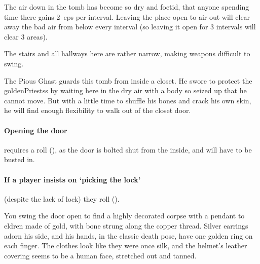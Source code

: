 \begin{multicols}{2}
The air down in the tomb has become so dry and foetid, that anyone spending time there gains 2~\glspl{ep} per \gls{interval}.
Leaving the place open to air out will clear away the bad air from  below every \gls{interval} (so leaving it open for 3 \glspl{interval} will clear 3 \glspl{area}).

The stairs and all hallways here are rather narrow, making weapons difficult to swing.%


The Pious Ghast guards this tomb from inside a closet.
He swore to protect the \glspl{goldenPriests} by waiting here in the dry air with a body so seized up that he cannot move.
But with a little time to shuffle his bones and crack his own skin, he will find enough flexibility to walk out of the closet door.


\paragraph{Opening the door}
requires a  roll (\tn[14]), as the door is bolted shut from the inside, and will have to be busted in.

\paragraph{If a player insists on `picking the lock'}
(despite the lack of lock) they roll  (\tn[16]).

\begin{boxtext}
  You swing the door open to find a highly decorated corpse with a pendant to \gls{eldren} made of gold, with bone strung along the copper thread.
  Silver earrings adorn his side, and his hands, in the classic death pose, have one golden ring on each finger.
  The clothes look like they were once silk, and the helmet's leather covering seems to be a human face, stretched out and tanned.
\end{boxtext}


\end{multicols}
